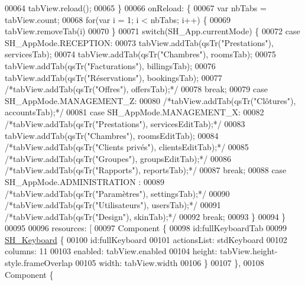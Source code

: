 \begin{DoxyCode}
00064         tabView.reload();
00065     \}
00066     onReload: \{
00067         var nbTabs = tabView.count;
00068         \textcolor{keywordflow}{for}(var i = 1; i < nbTabs; i++) \{
00069             tabView.removeTab(i)
00070         \}
00071         \textcolor{keywordflow}{switch}(SH\_App.currentMode) \{
00072         \textcolor{keywordflow}{case} SH\_AppMode.RECEPTION:
00073             tabView.addTab(qsTr(\textcolor{stringliteral}{"Prestations"}), servicesTab);
00074             tabView.addTab(qsTr(\textcolor{stringliteral}{"Chambres"}), roomsTab);
00075             tabView.addTab(qsTr(\textcolor{stringliteral}{"Facturations"}), billingsTab);
00076             tabView.addTab(qsTr(\textcolor{stringliteral}{"Réservations"}), bookingsTab);
00077             \textcolor{comment}{/*tabView.addTab(qsTr("Offres"), offersTab);*/}
00078             \textcolor{keywordflow}{break};
00079         \textcolor{keywordflow}{case} SH\_AppMode.MANAGEMENT\_Z:
00080             \textcolor{comment}{/*tabView.addTab(qsTr("Clôtures"), accountsTab);*/}
00081         \textcolor{keywordflow}{case} SH\_AppMode.MANAGEMENT\_X:
00082             \textcolor{comment}{/*tabView.addTab(qsTr("Prestations"), servicesEditTab);*/}
00083             tabView.addTab(qsTr(\textcolor{stringliteral}{"Chambres"}), roomsEditTab);
00084             \textcolor{comment}{/*tabView.addTab(qsTr("Clients privés"), clientsEditTab);*/}
00085             \textcolor{comment}{/*tabView.addTab(qsTr("Groupes"), groupsEditTab);*/}
00086             \textcolor{comment}{/*tabView.addTab(qsTr("Rapports"), reportsTab);*/}
00087             \textcolor{keywordflow}{break};
00088         \textcolor{keywordflow}{case} SH\_AppMode.ADMINISTRATION :
00089             \textcolor{comment}{/*tabView.addTab(qsTr("Paramètres"), settingsTab);*/}
00090             \textcolor{comment}{/*tabView.addTab(qsTr("Utilisateurs"), usersTab);*/}
00091             \textcolor{comment}{/*tabView.addTab(qsTr("Design"), skinTab);*/}
00092             \textcolor{keywordflow}{break};
00093         \}
00094     \}
00095 
00096     resources: [
00097         Component \{
00098             \textcolor{keywordtype}{id}:fullKeyboardTab
00099             \hyperlink{classSH__Keyboard}{SH\_Keyboard} \{
00100                 \textcolor{keywordtype}{id}:fullKeyboard
00101                 actionsList: stdKeyboard
00102                 columns: 11
00103                 enabled: tabView.enabled
00104                 height: tabView.height-style.frameOverlap
00105                 width: tabView.width
00106             \}
00107         \},
00108         Component \{

\end{DoxyCode}
